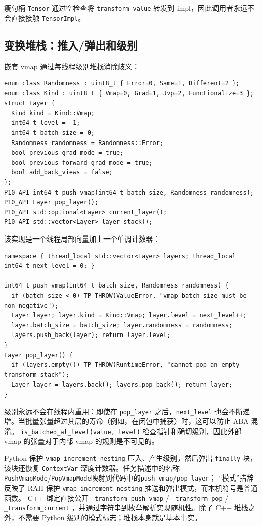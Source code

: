 瘦句柄 \texttt{Tensor} 通过空检查将 \texttt{transform\_value} 转发到 impl，因此调用者永远不会直接接触 \texttt{TensorImpl}。

\subsection{变换堆栈：推入/弹出和级别}
\label{sec:transformstack}

嵌套 vmap 通过每线程级别堆栈消除歧义：

\begin{lstlisting}[caption={layer stack.}, label=lst:layerstack]
enum class Randomness : uint8_t { Error=0, Same=1, Different=2 };
enum class Kind : uint8_t { Vmap=0, Grad=1, Jvp=2, Functionalize=3 };
struct Layer {
  Kind kind = Kind::Vmap;
  int64_t level = -1;
  int64_t batch_size = 0;
  Randomness randomness = Randomness::Error;
  bool previous_grad_mode = true;
  bool previous_forward_grad_mode = true;
  bool add_back_views = false;
};
P10_API int64_t push_vmap(int64_t batch_size, Randomness randomness);
P10_API Layer pop_layer();
P10_API std::optional<Layer> current_layer();
P10_API std::vector<Layer> layer_stack();
\end{lstlisting}

该实现是一个线程局部向量加上一个单调计数器：

\begin{lstlisting}[caption={stack and levels.}, label=lst:pushpop]
namespace { thread_local std::vector<Layer> layers; thread_local int64_t next_level = 0; }

int64_t push_vmap(int64_t batch_size, Randomness randomness) {
  if (batch_size < 0) TP_THROW(ValueError, "vmap batch size must be non-negative");
  Layer layer; layer.kind = Kind::Vmap; layer.level = next_level++;
  layer.batch_size = batch_size; layer.randomness = randomness;
  layers.push_back(layer); return layer.level;
}
Layer pop_layer() {
  if (layers.empty()) TP_THROW(RuntimeError, "cannot pop an empty transform stack");
  Layer layer = layers.back(); layers.pop_back(); return layer;
}
\end{lstlisting}

级别永远不会在线程内重用：即使在 \texttt{pop\_layer} 之后，\texttt{next\_level} 也会不断递增。当批量张量超过其层的寿命（例如，在闭包中捕获）时，这可以防止 ABA 混淆。 \texttt{is\_batched\_at\_level(value, level)} 检查指针和确切级别，因此外部 vmap 的张量对于内部 vmap 的规则是不可见的。

Python 保护 \texttt{vmap\_increment\_nesting} 压入、产生级别，然后弹出 \texttt{finally} 块，该块还恢复 \texttt{ContextVar} 深度计数器。任务描述中的名称\texttt{PushVmapMode}/\texttt{PopVmapMode}映射到代码中的\texttt{push\_vmap}/\texttt{pop\_layer}； “模式”措辞反映了 RAII 保护 \texttt{vmap\_increment\_nesting} 推送和弹出模式，而本机符号是普通函数。 C++ 绑定直接公开 \texttt{\_transform\_push\_vmap} / \texttt{\_transform\_pop} / \texttt{\_transform\_current} ，并通过字符串到枚举解析实现随机性。除了 C++ 堆栈之外，不需要 Python 级别的模式标志；堆栈本身就是基本事实。

